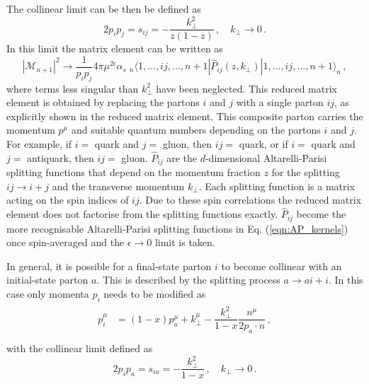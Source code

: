 \documentclass[main.tex]{subfiles}
\begin{document}
    The collinear limit can be then be defined as
    \begin{equation}\label{eqn:F_collinear limit}
        2 p_{i} p_{j} = s_{ij} = - \dfrac{k_{\perp}^{2}}{z(1-z)} \, , \quad k_{\perp} \rightarrow 0 \, .
    \end{equation}
    In this limit the matrix element can be written as
    \begin{equation}\label{eqn:F_collinear_factorisation}
        |\mathcal{M}_{n+1}|^{2} \rightarrow \dfrac{1}{p_{i}p_{j}}4\pi \mu^{2\epsilon}\alpha_{s} \; {}_{n} \langle 1, \ldots, ij, \ldots, n+1 | \hat{P}_{ij}(z, k_{\perp}) | 1, \ldots, ij, \ldots, n+1 \rangle_{n} \, ,
    \end{equation}
    where terms less singular than $k_{\perp}^{2}$ have been neglected.
    This reduced matrix element is obtained by replacing the partons
    $i$ and $j$ with a single parton $ij$, as explicitly shown in the reduced
    matrix element. This composite parton carries the
    momentum $p^{\mu}$ and suitable quantum numbers depending
    on the partons $i$ and $j$. For example, if $i =$ quark and $j=$ gluon,
    then $ij =$ quark, or if $i=$ quark and $j =$ antiquark, then $ij =$ gluon.
    $\hat{P}_{ij}$ are the $d$-dimensional Altarelli-Parisi splitting
    functions that depend on the momentum fraction $z$ for the splitting
    $ij \rightarrow i + j$ and the transverse momentum $k_{\perp}$.
    Each splitting function is a matrix acting on the spin indices of $ij$.
    Due to these spin correlations the reduced matrix
    element does not factorise from the splitting functions exactly.
    $\hat{P}_{ij}$ become the more recognisable Altarelli-Parisi
    splitting functions in Eq. (\ref{eqn:AP_kernels}) once spin-averaged
    and the $\epsilon \rightarrow 0$ limit is taken.

    In general, it is possible for a final-state
    parton $i$ to become collinear with an initial-state parton $a$.
    This is described by the splitting process $a \rightarrow ai + i$.
    In this case only momenta $p_{i}$ needs to be modified as
    \begin{align}\label{eqn:I_collinear_momenta}
        \begin{split}
        p_{i}^{\mu} &= (1-x)p_{a}^{\mu} + k_{\perp}^{\mu} - \dfrac{k_{\perp}^{2}}{1-x}\dfrac{n^{\mu}}{2p_{a} \cdot n} \, , \\
        \end{split}
    \end{align}
    with the collinear limit defined as
    \begin{equation}\label{eqn:I_collinear_limit}
        2p_{i}p_{a} = s_{ia} = -\dfrac{k_{\perp}^{2}}{1-x} \, , \quad k_{\perp} \rightarrow 0 \, .
    \end{equation}
\end{document}
